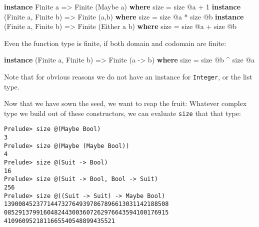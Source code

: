\documentclass[11pt,
  american,
  DIV13]{article}
\newenvironment{Shaded}{}{}
\newcommand{\DataTypeTok}[1]{\textcolor[rgb]{0.56,0.13,0.00}{#1}}
\newcommand{\DecValTok}[1]{\textcolor[rgb]{0.25,0.63,0.44}{#1}}
\newcommand{\KeywordTok}[1]{\textcolor[rgb]{0.00,0.44,0.13}{\textbf{#1}}}
\newcommand{\NormalTok}[1]{#1}
\newcommand{\OperatorTok}[1]{\textcolor[rgb]{0.40,0.40,0.40}{#1}}
\newcommand{\OtherTok}[1]{\textcolor[rgb]{0.00,0.44,0.13}{#1}}
\begin{document}
\begin{Shaded}
\begin{Highlighting}[]
\KeywordTok{instance} \DataTypeTok{Finite}\NormalTok{ a }\OtherTok{=\textgreater{}} \DataTypeTok{Finite}\NormalTok{ (}\DataTypeTok{Maybe}\NormalTok{ a) }\KeywordTok{where}
\NormalTok{    size }\OtherTok{=}\NormalTok{ size }\OperatorTok{@}\NormalTok{a }\OperatorTok{+} \DecValTok{1}
\KeywordTok{instance}\NormalTok{ (}\DataTypeTok{Finite}\NormalTok{ a, }\DataTypeTok{Finite}\NormalTok{ b) }\OtherTok{=\textgreater{}} \DataTypeTok{Finite}\NormalTok{ (a,b) }\KeywordTok{where}
\NormalTok{    size }\OtherTok{=}\NormalTok{ size }\OperatorTok{@}\NormalTok{a }\OperatorTok{*}\NormalTok{ size }\OperatorTok{@}\NormalTok{b}
\KeywordTok{instance}\NormalTok{ (}\DataTypeTok{Finite}\NormalTok{ a, }\DataTypeTok{Finite}\NormalTok{ b) }\OtherTok{=\textgreater{}} \DataTypeTok{Finite}\NormalTok{ (}\DataTypeTok{Either}\NormalTok{ a b) }\KeywordTok{where}
\NormalTok{    size }\OtherTok{=}\NormalTok{ size }\OperatorTok{@}\NormalTok{a }\OperatorTok{+}\NormalTok{ size }\OperatorTok{@}\NormalTok{b}
\end{Highlighting}
\end{Shaded}

Even the function type is finite, if both domain and codomain are
finite:

\begin{Shaded}
\begin{Highlighting}[]
\KeywordTok{instance}\NormalTok{ (}\DataTypeTok{Finite}\NormalTok{ a, }\DataTypeTok{Finite}\NormalTok{ b) }\OtherTok{=\textgreater{}} \DataTypeTok{Finite}\NormalTok{ (a }\OtherTok{{-}\textgreater{}}\NormalTok{ b) }\KeywordTok{where}
\NormalTok{    size }\OtherTok{=}\NormalTok{ size }\OperatorTok{@}\NormalTok{b }\OperatorTok{\^{}}\NormalTok{ size }\OperatorTok{@}\NormalTok{a}
\end{Highlighting}
\end{Shaded}

Note that for obvious reasons we do not have an instance for
\texttt{Integer}, or the list type.

Now that we have sown the seed, we want to reap the fruit: Whatever
complex type we build out of these constructors, we can evaluate
\texttt{size} that that type:

\begin{verbatim}
Prelude> size @(Maybe Bool)
3
Prelude> size @(Maybe (Maybe Bool))
4
Prelude> size @(Suit -> Bool)
16
Prelude> size @(Suit -> Bool, Bool -> Suit)
256
Prelude> size @((Suit -> Suit) -> Maybe Bool)
1390084523771447327649397867896613031142188508
0852913799160482443003607262976643594100176915
4109609521811665540548899435521
\end{verbatim}
\end{document}
